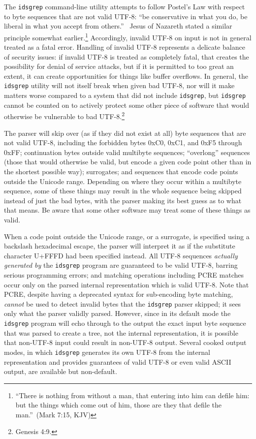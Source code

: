 \documentclass[twocolumn]{report}
\newcommand{\DangerousBend}{\marginpar{\large\hfill\dbend\hfill\null}}
\begin{document}
The \DangerousBend\texttt{idsgrep} command-line utility attempts to follow
Postel's Law with respect to byte sequences that are not valid UTF-8: ``be
conservative in what you do, be liberal in what you accept from
others.''~\cite{Postel:TCP} Jesus of Nazareth stated a similar principle
somewhat earlier.\footnote{``There is nothing from without a man, that
entering into him can defile him: but the things which come out of him,
those are they that defile the man.''~(Mark 7:15, KJV)} Accordingly, invalid
UTF-8 on input is not in general treated as a fatal error.  Handling of
invalid UTF-8 represents a delicate balance of security issues: if invalid
UTF-8 is treated as completely fatal, that creates the possibility for
denial of service attacks, but if it is permitted to too great an extent, it
can create opportunities for things like buffer overflows.  In general, the
\texttt{idsgrep} utility will not itself break when given bad UTF-8, nor
will it make matters worse compared to a system that did not include
\texttt{idsgrep}, but \texttt{idsgrep} cannot be counted on to actively
protect some other piece of software that would otherwise be vulnerable to
bad UTF-8.\footnote{Genesis 4:9.}

The parser will skip over (as if they did not exist at all) byte sequences
that are not valid UTF-8, including the forbidden bytes 0xC0, 0xC1, and 0xF5
through 0xFF; continuation bytes outside valid multibyte sequences;
``overlong'' sequences (those that would otherwise be valid, but encode a
given code point other than in the shortest possible way); surrogates; and
sequences that encode code points outside the Unicode range.  Depending on
where they occur within a multibyte sequence, some of these things may
result in the whole sequence being skipped instead of just the bad bytes,
with the parser making its best guess as to what that means.  Be aware that
some other software may treat some of these things as valid.

When a code point outside the Unicode range, or a surrogate, is specified
using a backslash hexadecimal escape, the parser will interpret it as if the
substitute character U+FFFD had been specified instead.  All UTF-8 sequences
\emph{actually generated by} the \texttt{idsgrep} program are guaranteed to
be valid UTF-8, barring serious programming errors; and matching operations
including PCRE matches occur only on the parsed internal representation
which is valid UTF-8.  Note that PCRE, despite having a deprecated syntax
for sub-encoding byte matching, \emph{cannot} be used to detect invalid bytes
that the \texttt{idsgrep} parser skipped; it sees only what the parser
validly parsed.  However, since in its default mode the \texttt{idsgrep}
program will echo through to the output the exact input byte sequence that
was parsed to create a tree, not the internal representation, it is possible
that non-UTF-8 input could result in non-UTF-8 output.  Several cooked
output modes, in which \texttt{idsgrep} generates its own UTF-8 from the
internal representation and provides guarantees of valid UTF-8 or even valid
ASCII output, are available but non-default.
\end{document}
